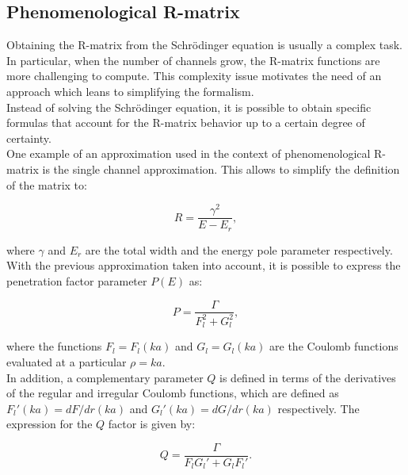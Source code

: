 \documentclass[openany]{book}
\begin{document}
\subsection{Phenomenological R-matrix} \label{sub:rmatrix_phenomenological}

Obtaining the R-matrix from the Schrödinger equation is usually a complex task. In particular, when the number of channels grow, the R-matrix functions are more challenging to compute. This complexity issue motivates the need of an approach which leans to simplifying the formalism.  \\

Instead of solving the Schrödinger equation, it is possible to obtain specific formulas that account for the R-matrix  behavior up to a certain degree of certainty.  \\

One example of an approximation used in the context of phenomenological R-matrix is the single channel approximation. This allows to simplify the definition of the matrix to: 

\begin{equation} \label{eq:rmatrix_simplified }
	R= \frac{\gamma^2}{E - E_r},
\end{equation}

where $\gamma$ and $E_r$ are the total width and the energy pole parameter respectively. \\

With the previous approximation taken into account, it is possible to express the penetration factor parameter $P(E)$ as:

\begin{equation} \label{eq:rmatrix_penetrationFactor_coulomb}
	P= \frac{\Gamma}{F_l^2 + G_l^2},
\end{equation}

where the functions $F_l = F_l(ka)$ and $G_l = G_l(ka)$ are the Coulomb functions evaluated at a particular $\rho = ka$. \\

In addition, a complementary parameter $Q$ is defined in terms of the derivatives of the regular and irregular Coulomb functions, which are defined as $F_l'(ka) = dF/dr(ka)$ and $G_l'(ka) = dG/dr(ka)$ respectively. The expression for the $Q$ factor is given by: 

\begin{equation} \label{eq:rmatrix_QFactor}
	Q = \frac{\Gamma}{F_lG_l' + G_lF_l'}.
\end{equation}
\end{document}
